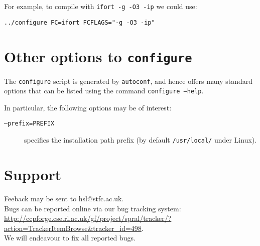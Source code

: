 \documentclass{spral}
\begin{document}
\noindent
For example, to compile with \texttt{ifort -g -O3 -ip} we could use:
\begin{verbatim}
../configure FC=ifort FCFLAGS="-g -O3 -ip"
\end{verbatim}

\section{Other options to \texttt{configure}}
The \texttt{configure} script is generated by \texttt{autoconf}, and hence
offers many standard options that can be listed using the command
\texttt{configure --help}.

\noindent
In particular, the following options may be of interest:
\begin{description}
   \item[\texttt{--prefix=PREFIX}] specifies the installation path prefix (by default \texttt{/usr/local/} under Linux).
\end{description}

\section{Support}
Feeback may be sent to hsl@stfc.ac.uk.\\
Bugs can be reported online via our bug tracking system: \\
\url{http://ccpforge.cse.rl.ac.uk/gf/project/spral/tracker/?action=TrackerItemBrowse&tracker_id=498}. \\
We will endeavour to fix all reported bugs.
\end{document}
